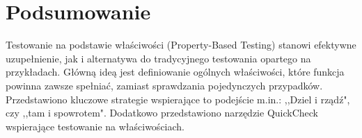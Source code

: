 \section{Podsumowanie}
Testowanie na podstawie właściwości (Property-Based Testing) stanowi efektywne uzupełnienie, jak i alternatywa do tradycyjnego testowania 
opartego na przykładach. Główną ideą jest definiowanie ogólnych właściwości, które funkcja powinna zawsze spełniać,
 zamiast sprawdzania pojedynczych przypadków. Przedstawiono kluczowe strategie wspierające to podejście m.in.: ,,Dziel i rządź", czy ,,tam i spowrotem".
Dodatkowo przedstawiono narzędzie QuickCheck wspierające testowanie na właściwościach.
